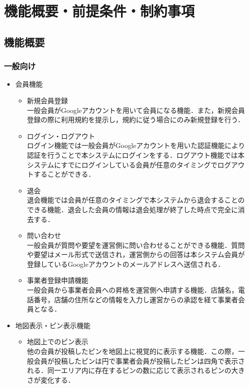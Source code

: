 \section{機能概要・前提条件・制約事項}
\subsection{機能概要}
\subsubsection{一般向け}
\begin{itemize}[itemsep=10pt]
    \item 会員機能
    \begin{itemize}[itemsep=10pt]
        \item 新規会員登録 \mbox{}\\
        一般会員がGoogleアカウントを用いて会員になる機能．また，新規会員登録の際に利用規約を提示し，規約に従う場合にのみ新規登録を行う．
        \item ログイン・ログアウト \mbox{}\\
        ログイン機能では一般会員がGoogleアカウントを用いた認証機能により認証を行うことで本システムにログインをする．ログアウト機能では本システムにすでにログインしている会員が任意のタイミングでログアウトすることができる．
        \item 退会 \mbox{}\\
        退会機能では会員が任意のタイミングで本システムから退会することのできる機能．退会した会員の情報は退会処理が終了した時点で完全に消去する．
        \item 問い合わせ \mbox{}\\
        一般会員が質問や要望を運営側に問い合わせることができる機能．質問や要望はメール形式で送信され，運営側からの回答は本システム会員が登録しているGoogleアカウントのメールアドレスへ送信される．
        \item 事業者登録申請機能 \mbox{}\\
        一般会員から事業者会員への昇格を運営側へ申請する機能．店舗名，電話番号，店舗の住所などの情報を入力し運営からの承認を経て事業者会員となる．
    \end{itemize}
    \item 地図表示・ピン表示機能
    \begin{itemize}[itemsep=10pt]
        \item 地図上でのピン表示 \mbox{}\\
        他の会員が投稿したピンを地図上に視覚的に表示する機能．この際，一般会員が投稿したピンは円で事業者会員が投稿したピンは四角で表示される．同一エリア内に存在するピンの数に応じて表示されるピンの大きさが変化する．

\end{itemize}
\end{itemize}
